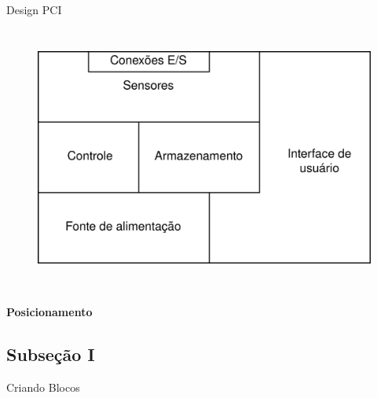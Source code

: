 \begin{frame}[allowframebreaks]{Design PCI}
\begin{columns}
        
        \raggedright
        \begin{figure}
            \centering
            \includegraphics[width=\linewidth]{figuras/cap3/particionamento.drawio.PNG}
            \label{fig:my_label}
        \end{figure}
    
    \end{columns}
    
    \framebreak
    
    \framesubtitle{{Posicionamento}}
    
    
    
    
    
    
    
\end{frame}



\subsection{Subseção I}
\begin{frame}{Criando Blocos}

\end{frame}
